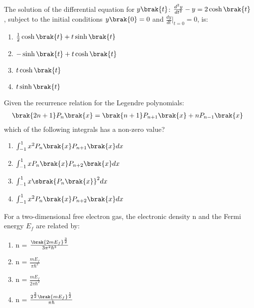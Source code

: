  \iffalse
        \chapter{2010}
        \author{AI24BTECH11034}
        \section{ph}
 \fi
\item The solution of the differential equation for $y\brak{t}$:  $\frac{d^2y}{dt^2} - y = 2 \cosh\brak{t}$, subject to the initial conditions $y\brak{0} = 0$ and $\frac{dy}{dt}|_{t=0} = 0$, is:
\begin{multicols}{2}
\begin{enumerate}
    \item $\frac{1}{2}\cosh\brak{t} + t\sinh\brak{t}$
    \item $-\sinh\brak{t} + t\cosh\brak{t}$
    \item $t\cosh\brak{t}$
    \item $t\sinh\brak{t}$
\end{enumerate}
\end{multicols}

\item Given the recurrence relation for the Legendre polynomials:
\begin{align*}
\brak{2n+1}P_n\brak{x} = \brak{n+1}P_{n+1}\brak{x} + nP_{n-1}\brak{x}
\end{align*}
which of the following integrals has a non-zero value?
\begin{multicols}{2}
\begin{enumerate}
    \item $\int_{-1}^{1} x^2 P_n\brak{x} P_{n+1}\brak{x} dx$
    \item $\int_{-1}^{1} x P_n\brak{x} P_{n+2}\brak{x} dx$
    \item $\int_{-1}^{1} x \sbrak{P_n\brak{x}}^2 dx$
    \item $\int_{-1}^{1} x^2 P_n\brak{x} P_{n+2}\brak{x} dx$
\end{enumerate}
\end{multicols}

\item For a two-dimensional free electron gas, the electronic density n and the Fermi energy $E_f$ are related by:
\begin{multicols}{2}
\begin{enumerate}
\item n = $\frac{\brak{2mE_f}^{\frac{3}{2}}}{3\pi^2\hbar^3}$\\

\item n = $\frac{mE_f}{\pi\hbar^2}$

\item n = $\frac{mE_f}{2\pi\hbar^2}$\\

\item n = $\frac{2^{\frac{3}{2}}\brak{mE_f}^{\frac{1}{2}}}{\pi\hbar}$

\end{enumerate}
\end{multicols}

